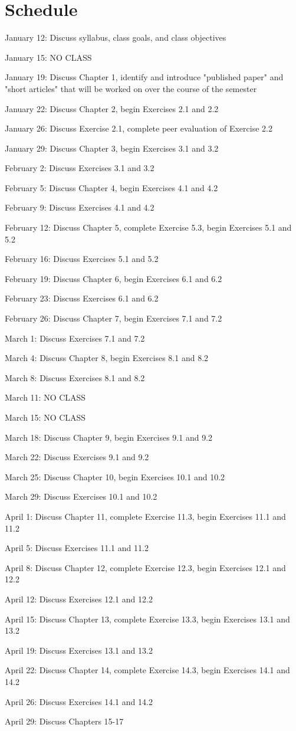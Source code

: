 \documentclass[12pt, notitlepage]{article}   	%
\begin{document}
{\section{Schedule}
January 12: Discuss syllabus, class goals, and class objectives\par
January 15: NO CLASS\par
January 19: Discuss Chapter 1, identify and introduce "published paper" and "short articles" 
that will be worked on over the course of the semester\par
January 22: Discuss Chapter 2, begin Exercises 2.1 and 2.2\par
January 26: Discuss Exercise 2.1, complete peer evaluation of Exercise 2.2\par
January 29: Discuss Chapter 3, begin Exercises 3.1 and 3.2\par
February 2: Discuss Exercises 3.1 and 3.2\par
February 5: Discuss Chapter 4, begin Exercises 4.1 and 4.2\par
February 9: Discuss Exercises 4.1 and 4.2\par
February 12: Discuss Chapter 5, complete Exercise 5.3, begin Exercises 5.1 and 5.2\par
February 16: Discuss Exercises 5.1 and 5.2\par
February 19: Discuss Chapter 6, begin Exercises 6.1 and 6.2\par
February 23: Discuss Exercises 6.1 and 6.2\par
February 26: Discuss Chapter 7, begin Exercises 7.1 and 7.2\par
March 1: Discuss Exercises 7.1 and 7.2\par
March 4: Discuss Chapter 8, begin Exercises 8.1 and 8.2\par
March 8: Discuss Exercises 8.1 and 8.2\par
March 11: NO CLASS\par
March 15: NO CLASS\par
March 18: Discuss Chapter 9, begin Exercises 9.1 and 9.2\par
March 22: Discuss Exercises 9.1 and 9.2\par
March 25: Discuss Chapter 10, begin Exercises 10.1 and 10.2\par
March 29: Discuss Exercises 10.1 and 10.2\par
April 1: Discuss Chapter 11, complete Exercise 11.3, begin Exercises 11.1 and 11.2\par
April 5: Discuss Exercises 11.1 and 11.2\par
April 8: Discuss Chapter 12, complete Exercise 12.3, begin Exercises 12.1 and 12.2\par
April 12: Discuss Exercises 12.1 and 12.2\par
April 15: Discuss Chapter 13, complete Exercise 13.3, begin Exercises 13.1 and 13.2\par
April 19: Discuss Exercises 13.1 and 13.2\par
April 22: Discuss Chapter 14, complete Exercise 14.3, begin Exercises 14.1 and 14.2\par
April 26: Discuss Exercises 14.1 and 14.2\par
April 29: Discuss Chapters 15-17\par
} %
\end{document}
